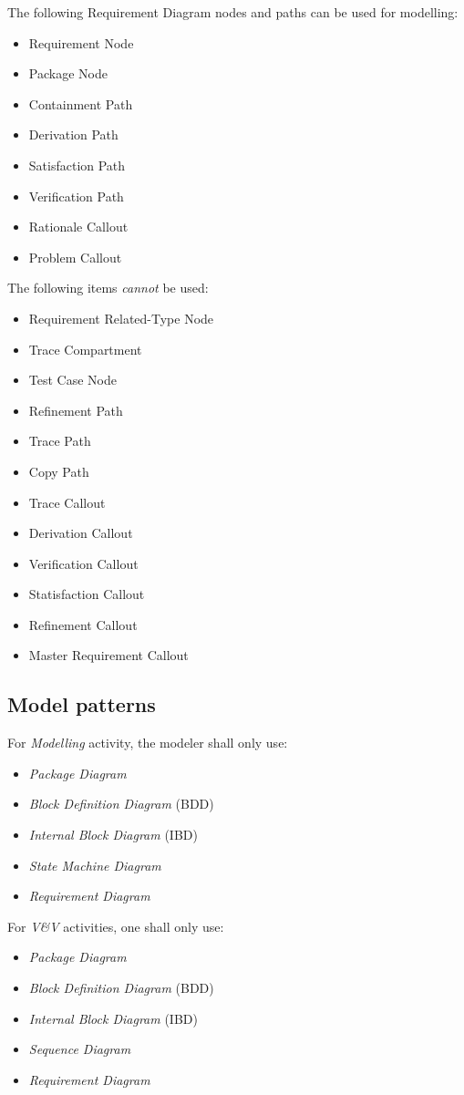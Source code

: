The following Requirement Diagram nodes and paths can be used for
modelling:
\begin{itemize}
\item Requirement Node
\item Package Node
\item Containment Path
\item Derivation Path
\item Satisfaction Path
\item Verification Path
\item Rationale Callout
\item Problem Callout
\end{itemize}

The following items \emph{cannot} be used:
\begin{itemize}
\item Requirement Related-Type Node
\item Trace Compartment
\item Test Case Node
\item Refinement Path
\item Trace Path
\item Copy Path
\item Trace Callout
\item Derivation Callout
\item Verification Callout
\item Statisfaction Callout
\item Refinement Callout
\item Master Requirement Callout
\end{itemize}



\subsection{Model patterns}

For \emph{Modelling} activity, the modeler shall only use:
\begin{itemize}
\item \emph{Package Diagram}
\item \emph{Block Definition Diagram} (BDD)
\item \emph{Internal Block Diagram} (IBD)
\item \emph{State Machine Diagram}
\item \emph{Requirement Diagram}
\end{itemize}

For \emph{V\&V} activities, one shall only use:
\begin{itemize}
\item \emph{Package Diagram}
\item \emph{Block Definition Diagram} (BDD)
\item \emph{Internal Block Diagram} (IBD)
\item \emph{Sequence Diagram}
\item \emph{Requirement Diagram}
\end{itemize}

